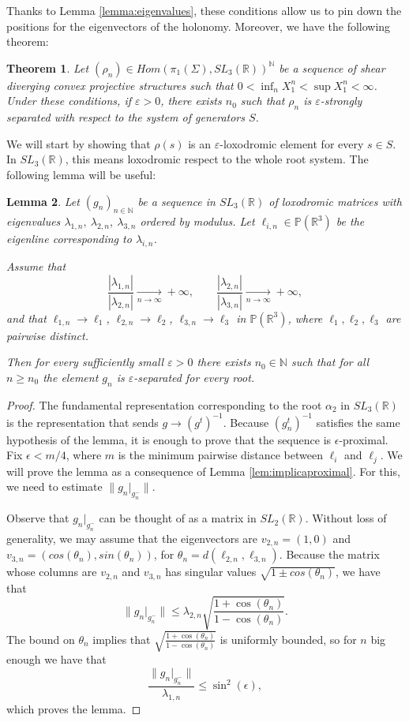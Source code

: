 \documentclass{amsart}
\newcommand{\RR}{\mathbb{R}}
\newtheorem{thm}{Theorem}[section]
\newtheorem{lemma}[thm]{Lemma}
\theoremstyle{remark}
\theoremstyle{definition}
\begin{document}
Thanks to Lemma \ref{lemma:eigenvalues}, these conditions allow us to pin down the positions for the eigenvectors of the holonomy.
Moreover, we have the following theorem:
\begin{thm}
\label{thm:divergingpants}
 Let $(\rho_n) \in Hom(\pi_1 (\Sigma), SL_3 (\mathbb{R}))^\mathbb{N}$ be a sequence of shear diverging convex projective structures such that $0< \inf_n X_1^n < \sup X_1^n < \infty$.
 Under these conditions, if $\varepsilon>0$, there exists $n_0$ such that $\rho_n$ is  $\varepsilon$-strongly separated with respect to the system of generators $S$.
\end{thm}

We will start by showing that $\rho (s)$ is an $\varepsilon$-loxodromic element for every $s \in S$.
In $SL_3 (\mathbb{R})$, this means loxodromic respect to the whole root system.
The following lemma will be useful:

\begin{lemma}
   \label{lem:estimativasl3}
 Let $(g_n)_{n\in\mathbb N}$ be a sequence in $SL_3(\mathbb R)$ of loxodromic matrices with eigenvalues $\lambda_{1,n},\ \lambda_{2,n},\ \lambda_{3,n}$
 ordered by modulus.
 Let $\ell_{i,n}\in \mathbb P(\mathbb R^3)$ be the eigenline corresponding to $\lambda_{i,n}$.
   
 Assume that
 \[
 \frac{|\lambda_{1,n}|}{|\lambda_{2,n}|}\xrightarrow[n\to\infty]{}+\infty,
 \qquad
 \frac{|\lambda_{2,n}|}{|\lambda_{3,n}|}\xrightarrow[n\to\infty]{}+\infty,
 \]
 and that $\ell_{1,n}\to \ell_1$, $\ell_{2,n}\to \ell_2$, $\ell_{3,n}\to \ell_3$ in $\mathbb P(\mathbb R^3)$, where $\ell_1,\ell_2,\ell_3$ are pairwise distinct.
   
 Then for every sufficiently small $\varepsilon>0$ there exists $n_0\in\mathbb N$ such that for all $n\ge n_0$ the element $g_n$ is $\varepsilon$-separated for every root.
\end{lemma}

\begin{proof}
 The fundamental representation corresponding to the root $\alpha_2$ in $SL_3(\RR)$ is the representation that sends $g \to (g^{t})^{-1}$. Because $(g_n^t)^{-1}$ satisfies the same hypothesis of the lemma, it is enough to prove that the sequence is $\epsilon$-proximal. Fix $\epsilon < m/4$, where $m$ is the minimum pairwise distance between $\ell_i$ and $\ell_j$. We will prove the lemma as a consequence of Lemma \ref{lem:implicaproximal}. For this, we need to estimate $\|g_n|_{g_n^-}\|$.

 Observe that $g_n|_{g_n^-}$ can be thought of as a matrix in $SL_2(\RR)$. Without loss of generality, we may assume that the eigenvectors are $v_{2,n} = (1,0)$ and $v_{3,n} = (cos(\theta_n), sin(\theta_n))$, for $\theta_n = d(\ell_{2, n}, \ell_{3, n})$. Because the matrix whose columns are $v_{2, n}$ and $v_{3,n}$ has singular values $\sqrt{1 \pm cos(\theta_n)}$, we have that $$\|g_n|_{g_n^-}\| \le \lambda_{2,n}\sqrt{\frac{1 + \cos(\theta_n)}{1 - \cos(\theta_n)}}.$$
 The bound on $\theta_n$ implies that $\sqrt{\frac{1 + \cos(\theta_n)}{1 - \cos(\theta_n)}}$ is uniformly bounded, so for $n$ big enough we have that 
 $$\frac{\|g_n|_{g_n^-}\|}{\lambda_{1, n}} \le \sin^2 (\epsilon),$$
 which proves the lemma.
\end{proof}
\end{document}
